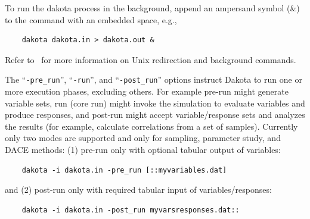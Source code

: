 
To run the dakota process in the background, append an ampersand
symbol (\&) to the command with an embedded space, e.g.,
\begin{small}
\begin{verbatim}
    dakota dakota.in > dakota.out &
\end{verbatim}
\end{small}

Refer to~\cite{And86} for more information on Unix redirection and
background commands.

The ``\texttt{-pre\_run}'', ``\texttt{-run}'', and
``\texttt{-post\_run}'' options instruct Dakota to run one or more
execution phases, excluding others. For example pre-run might
generate variable sets, run (core run) might invoke the simulation to
evaluate variables and produce responses, and post-run might accept
variable/response sets and analyzes the results (for example,
calculate correlations from a set of samples). Currently only two
modes are supported and only for sampling, parameter study, and DACE
methods: (1) pre-run only with optional tabular output of variables:
\begin{small}
\begin{verbatim}
    dakota -i dakota.in -pre_run [::myvariables.dat]
\end{verbatim}
\end{small}
and (2) post-run only with required tabular input of variables/responses:
\begin{small}
\begin{verbatim}
    dakota -i dakota.in -post_run myvarsresponses.dat::
\end{verbatim}
\end{small}


